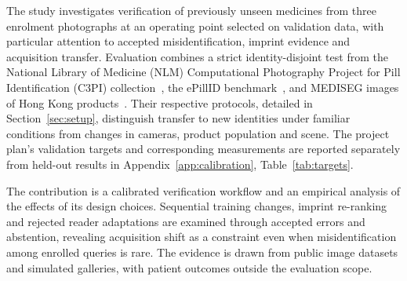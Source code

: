 The study investigates verification of previously unseen medicines from three enrolment photographs at an operating point selected on validation data, with particular attention to accepted misidentification, imprint evidence and acquisition transfer. Evaluation combines a strict identity-disjoint test from the National Library of Medicine (NLM) Computational Photography Project for Pill Identification (C3PI) collection~\citep{yaniv2016nlm}, the ePillID benchmark~\citep{usuyama2020epillid}, and MEDISEG images of Hong Kong products~\citep{mediseg2026}. Their respective protocols, detailed in Section~\ref{sec:setup}, distinguish transfer to new identities under familiar conditions from changes in cameras, product population and scene. The project plan's validation targets and corresponding measurements are reported separately from held-out results in Appendix~\ref{app:calibration}, Table~\ref{tab:targets}.

The contribution is a calibrated verification workflow and an empirical analysis of the effects of its design choices. Sequential training changes, imprint re-ranking and rejected reader adaptations are examined through accepted errors and abstention, revealing acquisition shift as a constraint even when misidentification among enrolled queries is rare. The evidence is drawn from public image datasets and simulated galleries, with patient outcomes outside the evaluation scope.
